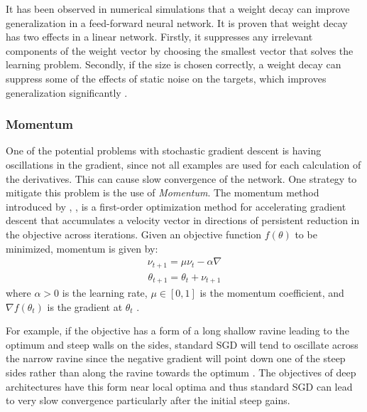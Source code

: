  It has been observed in numerical simulations that a weight decay can improve generalization in a feed-forward neural network. It is proven that weight decay has two effects in a linear network. Firstly, it suppresses any irrelevant components of the weight vector by choosing the smallest vector that solves the learning problem. Secondly, if the size is chosen correctly, a weight decay can suppress some of the effects of static noise on the targets, which improves generalization significantly \cite{moody1995simple}. 

\subsubsection{Momentum}
One of the potential problems with stochastic gradient descent is having oscillations in the gradient, since not all examples are used for each calculation of the derivatives. This can cause slow convergence of the network. One strategy to mitigate this problem is the use of \textit{Momentum}. The momentum method introduced by \citeauthor{polyak1964some}, \citeyear{polyak1964some}, is a first-order optimization method for accelerating gradient descent that accumulates a velocity vector in directions of persistent reduction in the objective across iterations. Given an objective function $f(\theta)$ to be minimized, momentum is given by:
\begin{equation}
	\label{eq:t}
	\begin{aligned}
		\nu_{t+1} = \mu\nu_t - \alpha\nabla 
	\end{aligned}
\end{equation}
\begin{equation}
	\label{eq:t}
	\begin{gathered}
	\theta_{t+1} = \theta_t + \nu_{t + 1}
	\end{gathered}
\end{equation}
where $\alpha > 0$ is the learning rate, $\mu \in [0,1]$ is the momentum coefficient, and $\nabla f(\theta_t)$ is the gradient at $\theta_t$ \cite{sutskever2013importance}. 

For example, if the objective has a form of a long shallow ravine leading to the optimum and steep walls on the sides, standard SGD will tend to oscillate across the narrow ravine since the negative gradient will point down one of the steep sides rather than along the ravine towards the optimum \cite{sgd}. The objectives of deep architectures have this form near local optima and thus standard SGD can lead to very slow convergence particularly after the initial steep gains. 

